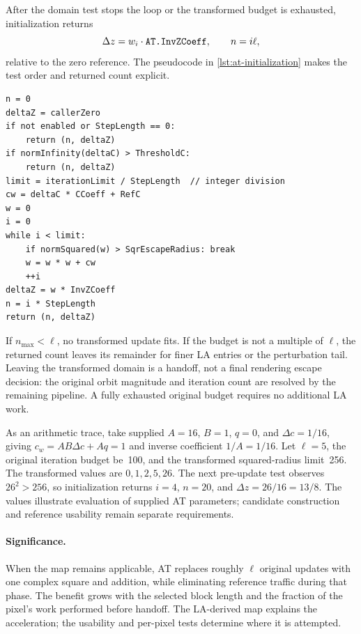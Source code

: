 After the domain test stops the loop or the transformed budget is
exhausted, initialization returns
\[
\Delta z=w_i\cdot\texttt{AT.InvZCoeff},\qquad n=i\ell,
\]
relative to the zero reference. The pseudocode in
\cref{lst:at-initialization} makes the test order and returned count explicit.

\begin{lstlisting}[float=htbp,caption={AT pixel initialization},label={lst:at-initialization}]
n = 0
deltaZ = callerZero
if not enabled or StepLength == 0:
    return (n, deltaZ)
if normInfinity(deltaC) > ThresholdC:
    return (n, deltaZ)
limit = iterationLimit / StepLength  // integer division
cw = deltaC * CCoeff + RefC
w = 0
i = 0
while i < limit:
    if normSquared(w) > SqrEscapeRadius: break
    w = w * w + cw
    ++i
deltaZ = w * InvZCoeff
n = i * StepLength
return (n, deltaZ)
\end{lstlisting}

If $n_{\max}<\ell$, no transformed update fits. If the budget is not
a multiple of $\ell$, the returned count leaves its remainder for
finer LA entries or the perturbation tail. Leaving the transformed
domain is a handoff, not a final rendering escape decision: the
original orbit magnitude and iteration count are resolved by the
remaining pipeline. A fully exhausted original budget requires no
additional LA work.

As an arithmetic trace, take supplied $A=16$, $B=1$, $q=0$, and
$\Delta c=1/16$, giving $c_w=AB\Delta c+Aq=1$ and inverse coefficient
$1/A=1/16$. Let $\ell=5$, the original iteration budget be~100, and the transformed
squared-radius limit~256. The transformed
values are $0,1,2,5,26$. The next pre-update test observes
$26^2>256$, so initialization returns $i=4$, $n=20$, and
$\Delta z=26/16=13/8$. The values illustrate evaluation of supplied AT
parameters; candidate construction and reference usability remain
separate requirements.

\paragraph{Significance.}
When the map remains applicable, AT replaces roughly $\ell$ original
updates with one complex square and addition, while eliminating
reference traffic during that phase. The benefit grows with the
selected block length and the fraction of the pixel's work performed
before handoff. The LA-derived map explains the acceleration; the
usability and per-pixel tests determine where it is attempted.

